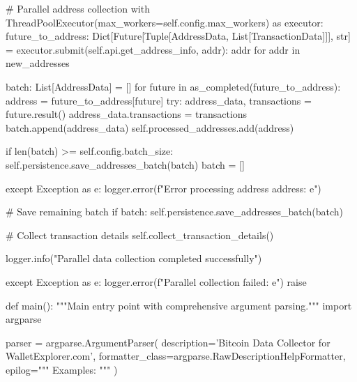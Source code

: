 \begin{codelisting}[language=Python, caption=Основной скрипт сбора данных]
                # Parallel address collection
                with ThreadPoolExecutor(max_workers=self.config.max_workers) as executor:
                    future_to_address: Dict[Future[Tuple[AddressData, List[TransactionData]]], str] = {
                        executor.submit(self.api.get_address_info, addr): addr 
                        for addr in new_addresses
                    }
                    
                    batch: List[AddressData] = []
                    for future in as_completed(future_to_address):
                        address = future_to_address[future]
                        try:
                            address_data, transactions = future.result()
                            address_data.transactions = transactions
                            batch.append(address_data)
                            self.processed_addresses.add(address)
                            
                            if len(batch) >= self.config.batch_size:
                                self.persistence.save_addresses_batch(batch)
                                batch = []
                                
                        except Exception as e:
                            logger.error(f"Error processing address {address}: {e}")
                    
                    # Save remaining batch
                    if batch:
                        self.persistence.save_addresses_batch(batch)
            
            # Collect transaction details
            self.collect_transaction_details()
            
            logger.info("Parallel data collection completed successfully")
            
        except Exception as e:
            logger.error(f"Parallel collection failed: {e}")
            raise


def main():
    """Main entry point with comprehensive argument parsing."""
    import argparse
    
    parser = argparse.ArgumentParser(
        description='Bitcoin Data Collector for WalletExplorer.com',
        formatter_class=argparse.RawDescriptionHelpFormatter,
        epilog="""
Examples:
        """
    )
    

\end{codelisting}
